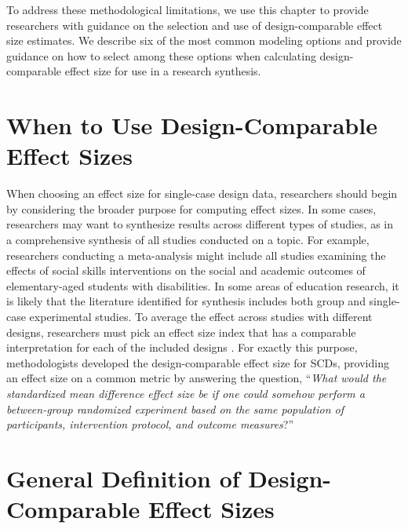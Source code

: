 \documentclass[
]{book}
\begin{document}
To address these methodological limitations, we use this chapter to provide researchers with guidance on the selection and use of design-comparable effect size estimates. We describe six of the most common modeling options and provide guidance on how to select among these options when calculating design-comparable effect size for use in a research synthesis.

\hypertarget{when-to-use-design-comparable-effect-sizes}{%
\section{When to Use Design-Comparable Effect Sizes}\label{when-to-use-design-comparable-effect-sizes}}

When choosing an effect size for single-case design data, researchers should begin by considering the broader purpose for computing effect sizes. In some cases, researchers may want to synthesize results across different types of studies, as in a comprehensive synthesis of all studies conducted on a topic. For example, researchers conducting a meta-analysis might include all studies examining the effects of social skills interventions on the social and academic outcomes of elementary-aged students with disabilities. In some areas of education research, it is likely that the literature identified for synthesis includes both group and single-case experimental studies. To average the effect across studies with different designs, researchers must pick an effect size index that has a comparable interpretation for each of the included designs \citep{Hedges2012ABk, Hedges2012MB, Pustejovsky2014design, shadish2015Role}. For exactly this purpose, methodologists developed the design-comparable effect size for SCDs, providing an effect size on a common metric by answering the question, ``\emph{What would the standardized mean difference effect size be if one could somehow perform a between-group randomized experiment based on the same population of participants, intervention protocol, and outcome measures}?''

\hypertarget{general-definition-of-design-comparable-effect-sizes}{%
\section{General Definition of Design-Comparable Effect Sizes}\label{general-definition-of-design-comparable-effect-sizes}}
\end{document}

